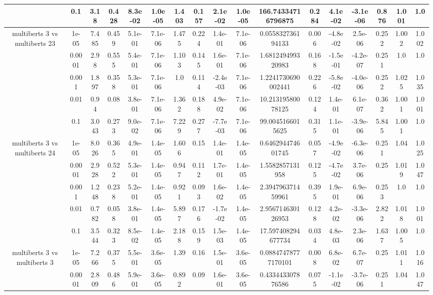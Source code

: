 \begin{tabular}{|c|c|c|c|c|c|c|c|c|c|c|c|c|c|c|c|c|}
 & 0.1 & 3.18 & 0.428 & 8.3e-02 & 1.0e-05 & 1.403 & 0.157 & 2.1e-02 & 1.0e-05 & 166.74334716796875 & 0.284 & 4.1e-02 & -3.1e-06 & 0.876 & 1.001 & 1.0 \\
\hline
\multirow{5}{*}{multiberts 3 vs multiberts 23} & 1e-05 & 7.485 & 0.459 & 5.1e-01 & 7.1e-06 & 1.475 & 0.224 & 1.4e-01 & 7.1e-06 & 0.055832736194133 & 0.006 & -4.8e-02 & 2.5e-06 & 0.252 & 1.002 & 1.002 \\
 & 0.0001 & 2.98 & 0.555 & 5.4e-01 & 7.1e-06 & 1.103 & 0.145 & 1.6e-01 & 7.1e-06 & 1.681249499320983 & 0.168 & -1.5e-01 & -4.2e-07 & 0.251 & 1.0 & 1.0 \\
 & 0.001 & 1.897 & 0.358 & 5.3e-01 & 7.1e-06 & 1.0 & 0.114 & -2.4e-03 & 7.1e-06 & 1.2241730690002441 & 0.226 & -5.8e-02 & -4.0e-06 & 0.252 & 1.025 & 1.035 \\
 & 0.01 & 0.94 & 0.08 & 3.8e-01 & 7.1e-06 & 1.362 & 0.188 & 4.9e-02 & 7.1e-06 & 10.21319580078125 & 0.124 & 1.4e-01 & 6.1e-07 & 0.362 & 1.001 & 1.001 \\
 & 0.1 & 3.043 & 0.273 & 9.0e-02 & 7.1e-06 & 7.229 & 0.277 & -7.7e-03 & 7.1e-06 & 99.0045166015625 & 0.315 & 1.1e-01 & -3.9e-06 & 5.845 & 1.001 & 1.0 \\
\hline
\multirow{5}{*}{multiberts 3 vs multiberts 24} & 1e-05 & 8.026 & 0.365 & 4.9e-01 & 1.4e-05 & 1.606 & 0.15 & 1.4e-01 & 1.4e-05 & 0.646294474601745 & 0.057 & -4.9e-02 & -6.3e-06 & 0.251 & 1.04 & 1.025 \\
 & 0.0001 & 2.928 & 0.522 & 5.3e-01 & 1.4e-05 & 0.947 & 0.112 & 1.7e-01 & 1.4e-05 & 1.5582857131958 & 0.125 & -4.7e-02 & 3.7e-06 & 0.25 & 1.019 & 1.047 \\
 & 0.001 & 1.248 & 0.238 & 5.2e-01 & 1.4e-05 & 0.921 & 0.093 & 1.6e-02 & 1.4e-05 & 2.394796371459961 & 0.395 & 1.9e-01 & 6.9e-06 & 0.253 & 1.0 & 1.0 \\
 & 0.01 & 0.782 & 0.058 & 3.8e-01 & 1.4e-05 & 5.897 & 0.176 & -1.7e-02 & 1.4e-05 & 2.956714630126953 & 0.128 & 4.2e-02 & -3.3e-06 & 2.822 & 1.018 & 1.001 \\
 & 0.1 & 3.544 & 0.323 & 8.5e-02 & 1.4e-05 & 2.188 & 0.159 & 1.5e-03 & 1.4e-05 & 17.597408294677734 & 0.034 & 4.8e-03 & 2.3e-06 & 1.637 & 1.005 & 1.0 \\
\hline
\multirow{5}{*}{multiberts 3 vs multiberts 3} & 1e-05 & 7.266 & 0.375 & 5.5e-01 & 3.6e-05 & 1.39 & 0.16 & 1.5e-01 & 3.6e-05 & 0.08847478777170101 & 0.008 & 6.8e-02 & 6.7e-07 & 0.25 & 1.011 & 1.016 \\
 & 0.0001 & 2.809 & 0.486 & 5.9e-01 & 3.6e-05 & 0.892 & 0.09 & 1.6e-01 & 3.6e-05 & 0.433443307876586 & 0.075 & -1.1e-02 & -3.7e-06 & 0.251 & 1.04 & 1.047 \\

\end{tabular}
